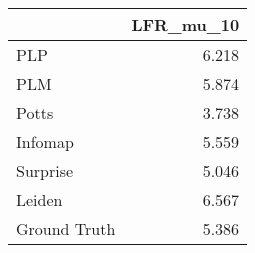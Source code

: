 \begin{tabular}{lr}
\toprule
{} & LFR_mu_10 \\
\midrule
PLP          &     6.218 \\
PLM          &     5.874 \\
Potts        &     3.738 \\
Infomap      &     5.559 \\
Surprise     &     5.046 \\
Leiden       &     6.567 \\
Ground Truth &     5.386 \\
\bottomrule
\end{tabular}
